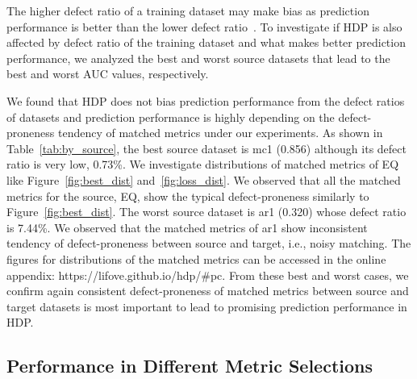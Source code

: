 The higher defect ratio of a training dataset may make bias as prediction performance is better than the lower defect ratio~\cite{Tantithamthavorn16}. To investigate if HDP is also affected by defect ratio of the training dataset and what makes better prediction performance, we analyzed the best and worst source datasets that lead to the best and worst AUC values, respectively.

We found that HDP does not bias prediction performance from the defect ratios of datasets and prediction performance is highly depending on the defect-proneness tendency of matched metrics under our experiments.
As shown in Table~\ref{tab:by_source}, the best source dataset is mc1 (0.856) although its defect ratio is very low, 0.73\%. We investigate distributions of matched metrics of EQ like Figure~\ref{fig:best_dist} and~\ref{fig:loss_dist}. We observed that all the matched metrics for the source, EQ, show the typical defect-proneness similarly to Figure~\ref{fig:best_dist}. The worst source dataset is ar1 (0.320) whose defect ratio is 7.44\%. We observed that the matched metrics of ar1 show inconsistent tendency of defect-proneness between source and target, i.e., noisy matching. The figures for distributions of the matched metrics can be accessed in the online appendix: https://lifove.github.io/hdp/\#pc. From these best and worst cases, we confirm again consistent defect-proneness of matched metrics between source and target datasets is most important to lead to promising prediction performance in HDP.



 

\subsection{Performance in Different Metric Selections}
\label{subsec04}

